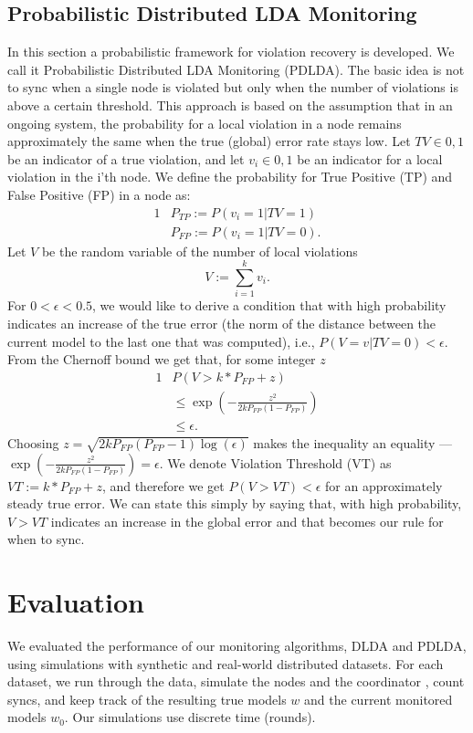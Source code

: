 \documentclass[11pt,twocolumn,varwidth=true,a4paper,fleqn]{article}
\begin{document}
\subsection{Probabilistic Distributed LDA Monitoring}
In this section a probabilistic framework for violation recovery is developed.
We call it Probabilistic Distributed LDA Monitoring (PDLDA). The basic idea is
not to sync when a single node is violated but only when the number of
violations is above a certain threshold. 
This approach is based on the assumption that in an ongoing system, 
the probability for a local violation in a node remains approximately the same
when the true (global) error rate stays low. 
Let $TV \in {0,1}$ be an indicator of a true violation,
and let $v_i \in {0,1}$ be an indicator for a local violation in the
i'th node. We define the probability for True Positive (TP) and False Positive
(FP) in a node as:
\begin{alignat*}{1}
& P_{TP} := P(v_i=1 | TV=1) \\
& P_{FP} := P(v_i=1 | TV=0).
\end{alignat*}
Let $V$ be the random variable of the number of local violations
\begin{equation*}
V := \sum_{i=1}^k v_i.
\end{equation*}
For $0 < \epsilon < 0.5$, we would like to derive a condition that 
with high probability indicates an increase of the true error (the norm of
the distance between the current model to the last one that was computed),
i.e., $P(V=v|TV=0) < \epsilon$.
From the Chernoff bound we get that, for some integer $z$
\begin{alignat*}{1}
& P(V>k*P_{FP}+z) \\
& \leq \exp(-\frac{z^2}{2kP_{FP}(1-P_{FP})}) \\
& \leq \epsilon.
\end{alignat*}
Choosing $z=\sqrt{2kP_{FP}(P_{FP}-1)\log(\epsilon)}$ makes the inequality an
equality --- $\exp(-\frac{z^2}{2kP_{FP}(1-P_{FP})}) = \epsilon$. We denote
Violation Threshold (VT) as $VT:=k*P_{FP}+z$, and therefore we get 
$P(V > VT) < \epsilon$ for an approximately steady true error.
We can state this simply by saying that, with high probability, $V > VT$
indicates an increase in the global error and that becomes our rule for when to
sync.
\section{Evaluation}
We evaluated the performance of our monitoring algorithms,
DLDA and PDLDA, using simulations with synthetic and real-world 
distributed datasets. For each dataset, we run through 
the data, simulate the nodes and the coordinator , count syncs,
and keep track of the resulting true models $w$ and the
current monitored models $w_0$. Our simulations use discrete
time (rounds).
\end{document}
